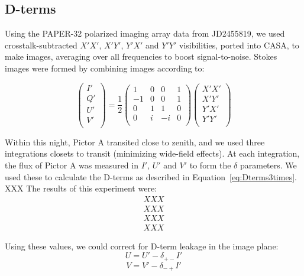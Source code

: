 \subsection{D-terms}

Using the PAPER-32 polarized imaging array data from JD2455819, we used crosstalk-subtracted $X'X'$, $X'Y'$, $Y'X'$ and $Y'Y'$ visibilities, ported into CASA, to make images, averaging over all frequencies to boost signal-to-noise. Stokes images were formed by combining images according to:

\begin{equation}
\begin{pmatrix}
I' \\
Q' \\
U' \\
V' \\
\end{pmatrix}
=\frac{1}{2}
\begin{pmatrix}
1 & 0 & 0 & 1 \\
-1& 0 & 0 & 1 \\
0 & 1 & 1 & 0 \\
0 & i & -i & 0 \\
\end{pmatrix}
\begin{pmatrix}
X'X' \\
X'Y' \\
Y'X' \\
Y'Y' \\
\end{pmatrix}
\end{equation}

Within this night, Pictor A transited close to zenith, and we used three integrations closets to transit (minimizing wide-field effects). At each integration, the flux of Pictor A was measured in $I'$, $U'$ and $V'$ to form the $\delta$ parameters. We used these to calculate the D-terms as described in Equation~\ref{eq:Dterms3times}.\\  

XXX The results of this experiment were:\\
\begin{align*}
XXX\\
XXX\\
XXX\\
XXX
\end{align*}

Using these values, we could correct for D-term leakage in the image plane:
\begin{equation}
U = U' - \delta_{+-}I'
\end{equation}
\begin{equation}
V = V' - \delta_{-+}I'
\end{equation}


